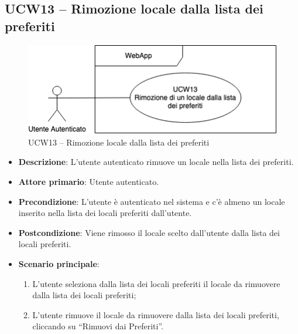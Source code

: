 \subsection{UCW13 – Rimozione locale dalla lista dei preferiti}
\begin{figure}[!h]
\centering
    \includegraphics[scale=0.5]{UC_images/UCW13.png} 
    \caption{UCW13 – Rimozione locale dalla lista dei preferiti}
\end{figure}
\begin{itemize}
	\item \textbf{Descrizione}: L'utente autenticato rimuove un locale nella lista dei preferiti.
    \item \textbf{Attore primario}: Utente autenticato.
    \item \textbf{Precondizione}:  L’utente è autenticato nel sistema e c'è almeno un locale inserito nella lista dei locali preferiti dall’utente.
    \item \textbf{Postcondizione}: Viene rimosso il locale scelto dall’utente dalla lista dei locali preferiti.
    \item \textbf{Scenario principale}:
    \begin{enumerate}
        \item L’utente seleziona dalla lista dei locali preferiti il locale da rimuovere dalla lista dei locali preferiti;
        \item L’utente rimuove il locale da rimuovere dalla lista dei locali preferiti, cliccando su “Rimuovi dai Preferiti”.
    \end{enumerate}
\end{itemize}

\pagebreak